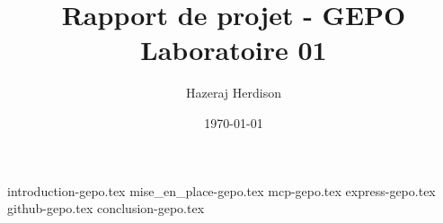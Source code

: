 \documentclass[12pt]{report}
\title{Rapport de projet - GEPO \\ \large Laboratoire 01}
\author{Hazeraj Herdison}
\date{\today}
\begin{document}
\maketitle
\tableofcontents
\newpage

{introduction-gepo.tex}
{mise_en_place-gepo.tex}
{mcp-gepo.tex}
{express-gepo.tex}
{github-gepo.tex}
{conclusion-gepo.tex}
\end{document}
